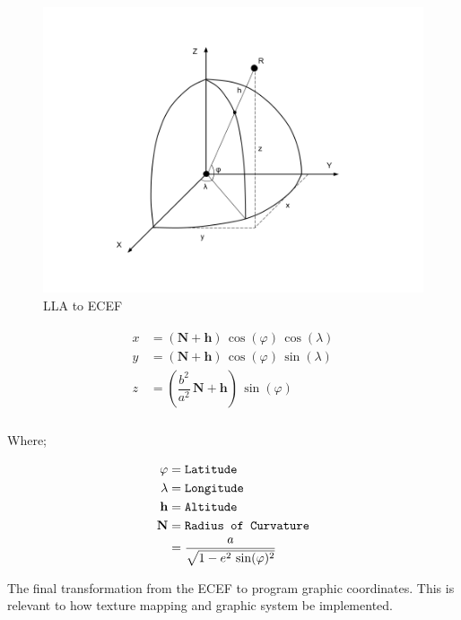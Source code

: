 \begin{figure}[H]
\caption{LLA to ECEF}
\label{fig:lla2ecef}
\centering
\includegraphics[width=\linewidth]{Figures/lla2ecef.png}
\decoRule
\end{figure}

\[
\begin{array}{lr}
\begin{aligned}
x &= (\mathbf{N} + \mathbf{h})\,\cos(\varphi)\,\cos(\lambda)\\
y &= (\mathbf{N} + \mathbf{h})\,\cos(\varphi)\,\sin(\lambda)\\
z &= (\dfrac{b^2}{a^2}\,\mathbf{N} + \mathbf{h})\,\sin(\varphi)\\
\end{aligned}
\end{array}
\]

Where;

\[
\begin{array}{lr}
\begin{aligned}
\varphi &= \texttt{Latitude}\\
\lambda &= \texttt{Longitude}\\
\mathbf{h} &= \texttt{Altitude}\\
\mathbf{N} &= \texttt{Radius of Curvature}\\
&= \dfrac{a}{\sqrt{1 - e^2\,\sin(\varphi)^2}}\\
\end{aligned}
\end{array}
\]

The final transformation from the ECEF to program graphic coordinates. This is relevant to how texture mapping and graphic system be implemented.

